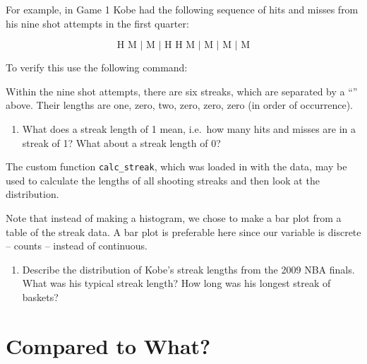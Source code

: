 \documentclass[]{book}
\newenvironment{Shaded}{\begin{snugshade}}{\end{snugshade}}
\newcommand{\KeywordTok}[1]{\textcolor[rgb]{0.13,0.29,0.53}{\textbf{{#1}}}}
\newcommand{\DecValTok}[1]{\textcolor[rgb]{0.00,0.00,0.81}{{#1}}}
\newcommand{\StringTok}[1]{\textcolor[rgb]{0.31,0.60,0.02}{{#1}}}
\newcommand{\NormalTok}[1]{{#1}}
\providecommand{\tightlist}{%
  \setlength{\itemsep}{0pt}\setlength{\parskip}{0pt}}
\theoremstyle{definition}
\theoremstyle{definition}
\theoremstyle{remark}
\begin{document}
For example, in Game 1 Kobe had the following sequence of hits and
misses from his nine shot attempts in the first quarter:

\[ \textrm{H M | M | H H M | M | M | M} \]

To verify this use the following command:

\begin{Shaded}
\end{Shaded}

Within the nine shot attempts, there are six streaks, which are
separated by a ``\textbar{}'' above. Their lengths are one, zero, two,
zero, zero, zero (in order of occurrence).

\begin{enumerate}
\def\labelenumi{\arabic{enumi}.}
\tightlist
\item
  What does a streak length of 1 mean, i.e.~how many hits and misses are
  in a streak of 1? What about a streak length of 0?
\end{enumerate}

The custom function \texttt{calc\_streak}, which was loaded in with the
data, may be used to calculate the lengths of all shooting streaks and
then look at the distribution.

\begin{Shaded}
\end{Shaded}

Note that instead of making a histogram, we chose to make a bar plot
from a table of the streak data. A bar plot is preferable here since our
variable is discrete -- counts -- instead of continuous.

\begin{enumerate}
\def\labelenumi{\arabic{enumi}.}
\setcounter{enumi}{1}
\tightlist
\item
  Describe the distribution of Kobe's streak lengths from the 2009 NBA
  finals. What was his typical streak length? How long was his longest
  streak of baskets?
\end{enumerate}

\section*{Compared to What?}\label{compared-to-what}
\end{document}
